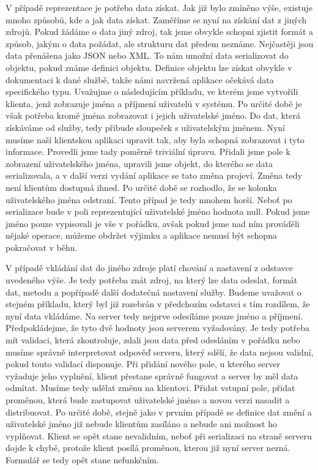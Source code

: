 V případě reprezentace je potřeba data získat. Jak již bylo zmíněno výše, existuje mnoho způsobů, kde a jak data získat. Zaměříme se nyní na získání dat z jiných zdrojů. Pokud žádáme o data jiný zdroj, tak jsme obvykle schopni zjistit formát a způsob, jakým o data požádat, ale strukturu dat předem neznáme. Nejčastěji jsou data přenášena jako JSON \cite{javaEE} nebo XML. To nám umožní data serializovat do objektu, pokud známe definici objektu. Definice objektu lze získat obvykle v dokumentaci k dané službě, takže námi navržená aplikace očekává data specifického typu. Uvažujme o následujícím příkladu, ve kterém jsme vytvořili klienta, jenž zobrazuje jména a příjmení uživatelů v systému. Po určité době je však potřeba kromě jména zobrazovat i jejich uživatelské jméno. Do dat, která získáváme od služby, tedy přibude sloupeček s uživatelským jménem. Nyní musíme naší klientskou aplikaci upravit tak, aby byla schopná zobrazovat i tyto informace. Provedli jsme tady poměrně triviální úpravu. Přidali jsme pole k zobrazení uživatelského jména, upravili jsme objekt, do kterého se data serializovala, a v další verzi vydání aplikace se tato změna projeví. Změna tedy není klientům dostupná ihned. Po určité době se rozhodlo, že se kolonka uživatelského jména odstraní. Tento případ je tedy mnohem horší. Neboť po serializace bude v poli reprezentující uživatelské jméno hodnota null. Pokud jsme jméno pouze vypisovali je vše v pořádku, avšak pokud jsme nad ním prováděli nějaké operace, můžeme obdržet výjimku a aplikace nemusí být schopna pokračovat v běhu.

V případě vkládání dat do jiného zdroje platí chování a nastavení z odstavce uvedeného výše. Je tedy potřeba znát zdroj, na který lze data odeslat, formát dat, metodu a popřípadě další dodatečná nastavení služby. Budeme uvažovat o stejném příkladu, který byl již rozebrán v předchozím odstavci s tím rozdílem, že nyní data vkládáme. Na server tedy nejprve odesíláme pouze jméno a příjmení. Předpokládejme, že tyto dvě hodnoty jsou serverem vyžadovány. Je tedy potřeba mít validaci, která zkontroluje, zdali jsou data před odesláním v pořádku nebo musíme správně interpretovat odpověď serveru, který sdělí, že data nejsou validní, pokud touto validací disponuje. Při přidání nového pole, u kterého server vyžaduje jeho vyplnění, klient přestane správně fungovat a server by měl data odmítat. Musíme tedy udělat změnu na klientovi. Přidat vstupní pole, přidat proměnou, která bude zastupovat uživatelské jméno a novou verzi nasadit a distribuovat. Po určité době, stejně jako v prvním případě se definice dat změní a uživatelské jméno již nebude klientům zasíláno a nebude ani možnost ho vyplňovat. Klient se opět stane nevalidním, neboť při serializaci na straně serveru dojde k chybě, protože klient posílá proměnou, kterou již nyní server nezná. Formulář se tedy opět stane nefunkčním.
